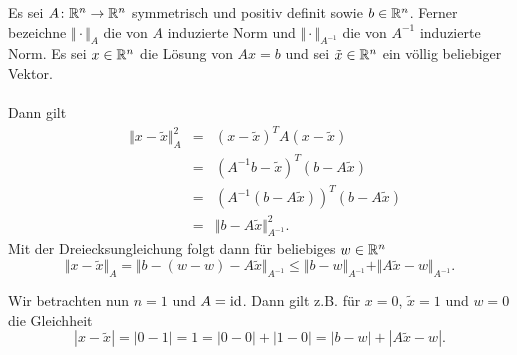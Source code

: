 
Es sei $A\colon \mathbb{R}^n\to\mathbb{R}^n$ symmetrisch und positiv definit sowie $b\in\mathbb{R}^n$.
Ferner bezeichne $\Vert\cdot\Vert_A$ die von $A$ induzierte Norm und
$\Vert\cdot\Vert_{A^{-1}}$ die von $A^{-1}$ induzierte Norm. Es sei $x\in\mathbb{R}^n$
die Lösung von $Ax=b$ und sei $\tilde x\in\mathbb{R}^n$ ein völlig beliebiger Vektor.
\\ \\
Dann gilt
\begin{align*}
 &\Vert x-\tilde x \Vert_A^2 &=&(x-\tilde x)^TA(x-\tilde x)\\&&=&(A^{-1}b-\tilde x)^T(b-A\tilde x)\\
 &&=&(A^{-1}(b-A\tilde x))^T(b-A\tilde x)\\&&=&\Vert b-A\tilde x\Vert_{A^{-1}}^2.
\end{align*}
Mit der Dreiecksungleichung folgt dann für beliebiges $w\in\mathbb{R}^n$
\begin{displaymath}
 \Vert x-\tilde x \Vert_A=\Vert b-(w-w)-A\tilde x\Vert_{A^{-1}}\leq \Vert b-w\Vert_{A^{-1}}+\Vert A\tilde x-w\Vert_{A^{-1}}.
\end{displaymath}

Wir betrachten nun $n=1$ und $A=\operatorname{id}$. Dann gilt z.B. für $x=0$, $\tilde x=1$ und $w=0$ die Gleichheit
\begin{displaymath}
 |x-\tilde x|=|0-1|=1=|0-0|+|1-0|=|b-w|+|A\tilde x-w|.
\end{displaymath}
